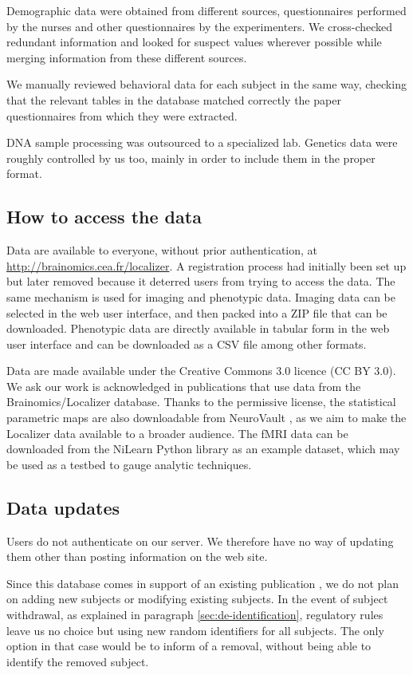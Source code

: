 \documentclass[preprint,12pt]{elsarticle}
\begin{document}
Demographic data were obtained from different sources, questionnaires performed by the nurses and other questionnaires by the experimenters. We cross-checked redundant information and looked for suspect values wherever possible while merging information from these different sources.

We manually reviewed behavioral data for each subject in the same way, checking that the relevant tables in the database matched correctly the paper questionnaires from which they were extracted.

DNA sample processing was outsourced to a specialized lab. Genetics data were roughly controlled by us too, mainly in order to include them in the proper format.

\subsection{How to access the data}

Data are available to everyone, without prior authentication, at \url{http://brainomics.cea.fr/localizer}. A registration process had initially been set up but later removed because it deterred users from trying to access the data. The same mechanism is used for imaging and phenotypic data. Imaging data can be selected in the web user interface, and then packed into a ZIP file that can be downloaded. Phenotypic data are directly available in tabular form in the web user interface and can be downloaded as a CSV file among other formats.

Data are made available under the Creative Commons 3.0 licence (CC BY 3.0). We ask our work is acknowledged in publications that use data from the Brainomics/Localizer database. Thanks to the permissive license, the statistical parametric maps are also downloadable from NeuroVault \cite{NeuroVault2014}, as we aim to make the Localizer data available to a broader audience.
The fMRI data can be downloaded from the NiLearn Python library \cite{NiLearn} as an example dataset, which may be used as a testbed to gauge analytic techniques.

\subsection{Data updates}

Users do not authenticate on our server. We therefore have no way of updating them other than posting information on the web site.

Since this database comes in support of an existing publication \cite{Pinel2012}, we do not plan on adding new subjects or modifying existing subjects. In the event of subject withdrawal, as explained in paragraph \ref{sec:de-identification}, regulatory rules leave us no choice but using new random identifiers for all subjects. The only option in that case would be to inform of a removal, without being able to identify the removed subject.
\end{document}
